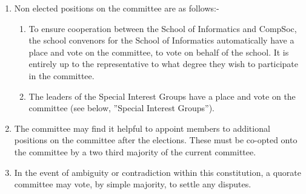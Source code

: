 \begin {enumerate}
    It is important to note that the above are suggestions to what those elected
    to the positions should be responsible, not absolute rules. Delegation is
    encouraged and necessary, but those in the relevant positions should take
    responsibility for delegating the tasks and making sure they get done.

    \item Non elected positions on the committee are as follows:-
      \begin{enumerate}
        \item To ensure cooperation between the School of Informatics and CompSoc,
          the school convenors for the School of Informatics automatically
          have a place and vote on the committee, to vote on behalf of the school.
          It is entirely up to the representative to what degree they wish
          to participate in the committee.
        \item The leaders of the Special Interest Groups have a place and vote on
          the committee (see below, ”Special Interest Groups”).
      \end{enumerate}

    \item The committee may find it helpful to appoint members to additional positions
      on the committee after the elections. These must be co-opted onto the committee by a two
      third majority of the current committee.

    \item In the event of ambiguity or contradiction within this constitution, a quorate committee may vote, by simple majority, to settle any disputes.

\end{enumerate}
